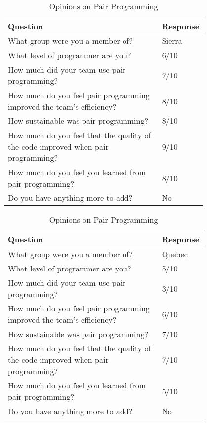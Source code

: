 \documentclass{article}
\begin{document}
\begin{table}[ht]
\centering
\renewcommand{\arraystretch}{1.3}
\caption{Opinions on Pair Programming}
\begin{tabular}{|p{0.8\linewidth}|l|}
\hline
\textbf{Question} & \textbf{Response} \\
\hline
What group were you a member of? & Sierra \\
\hline 
What level of programmer are you? & 6/10\\
\hline 
How much did your team use pair programming? & 7/10\\
\hline 
How much do you feel pair programming improved the team's efficiency? & 8/10\\
\hline 
How sustainable was pair programming? & 8/10\\
\hline 
How much do you feel that the quality of the code improved when pair programming? & 9/10\\
\hline 
How much do you feel you learned from pair programming? & 8/10\\
\hline 
Do you have anything more to add? &  No\\
\hline
\end{tabular}
\end{table}

\begin{table}[ht]
\centering
\renewcommand{\arraystretch}{1.3}
\caption{Opinions on Pair Programming}
\begin{tabular}{|p{0.8\linewidth}|l|}
\hline
\textbf{Question} & \textbf{Response} \\
\hline
What group were you a member of? & Quebec \\
\hline 
What level of programmer are you? & 5/10\\
\hline 
How much did your team use pair programming? & 3/10\\
\hline 
How much do you feel pair programming improved the team's efficiency? & 6/10\\
\hline 
How sustainable was pair programming? & 7/10\\
\hline 
How much do you feel that the quality of the code improved when pair programming? & 7/10\\
\hline 
How much do you feel you learned from pair programming? & 5/10\\
\hline 
Do you have anything more to add? & No\\
\hline
\end{tabular}
\end{table}
\end{document}
